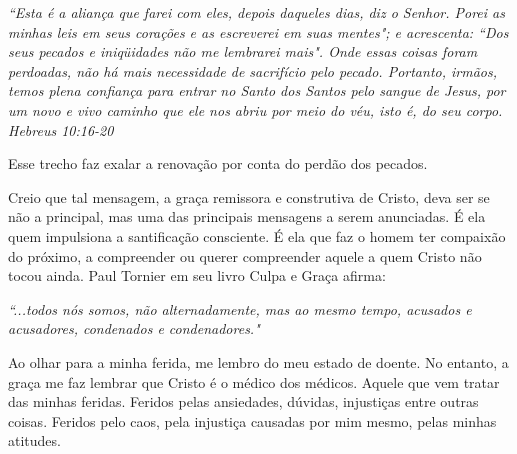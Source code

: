 \documentclass[12pt, legalpaper]{article}
\begin{document}
\emph{``Esta é a aliança que farei com eles, depois daqueles dias, diz o Senhor. Porei as minhas leis em seus corações e as escreverei em suas mentes"; e acrescenta: ``Dos seus pecados e iniqüidades não me lembrarei mais". Onde essas coisas foram perdoadas, não há mais necessidade de sacrifício pelo pecado. Portanto, irmãos, temos plena confiança para entrar no Santo dos Santos pelo sangue de Jesus, por um novo e vivo caminho que ele nos abriu por meio do véu, isto é, do seu corpo. Hebreus 10:16-20}

Esse trecho faz exalar a renovação por conta do perdão dos pecados. 

Creio que tal mensagem, a graça remissora e construtiva de Cristo, deva ser se não a principal, mas uma das principais mensagens a serem anunciadas. É ela quem impulsiona a santificação consciente. É ela que faz o homem ter compaixão do próximo, a compreender ou querer compreender aquele a quem Cristo não tocou ainda. Paul Tornier em seu livro Culpa e Graça afirma: 

\emph{``...todos nós somos, não alternadamente, mas ao mesmo tempo, acusados e acusadores, condenados e condenadores."}

Ao olhar para a minha ferida, me lembro do meu estado de doente. No entanto, a graça me faz lembrar que Cristo é o médico dos médicos. Aquele que vem tratar das minhas feridas. Feridos pelas ansiedades, dúvidas, injustiças entre outras coisas. Feridos pelo caos, pela injustiça causadas por mim mesmo, pelas minhas atitudes.
\end{document}
